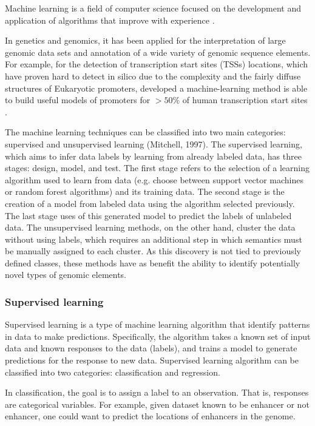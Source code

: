 Machine learning is a field of computer science focused on the development and application of algorithms that improve with experience \cite{mitchell1997machine}.

In genetics and genomics, it has been applied
 for the interpretation of large genomic data sets and annotation of a wide variety of genomic sequence elements.
For example, for the detection of  transcription start sites (TSSs) locations, which have proven hard to detect in silico due to the complexity and the fairly diffuse structures of Eukaryotic promoters,  developed a machine-learning method is able to build useful models of promoters for $>50\%$ of human transcription start sites \cite{down2002computational}.

The machine learning techniques can be classified into two main categories: supervised and unsupervised learning (Mitchell, 1997). The supervised learning, which aims to infer data labels by learning from already labeled data, has three stages: design, model, and test. The first stage refers to the selection of a learning algorithm used to learn from data (e.g. choose between support vector machines or random forest algorithms) and its training data. The second stage is the creation of a model from labeled data using the algorithm selected previously.  The last stage uses of this generated model to  predict the labels of unlabeled data.
The unsupervised learning methods, on the other hand,
cluster the data without using labels, which requires an additional step in which semantics must be manually assigned to each cluster. As this discovery is not tied to previously defined classes, these methods have as benefit the ability to identify potentially novel types of genomic elements.




\subsubsection{Supervised learning}

Supervised learning is a type of machine learning algorithm that identify patterns in data to make predictions.
Specifically, the algorithm takes a known set of input data and known responses to the data (labels), and trains a model to generate predictions for the response to new data.
Supervised learning algorithm can be classified into two  categories: classification and regression.

In classification, the goal is to assign a label to an observation. That is, responses are categorical variables.
For example, given dataset known to be
enhancer or not enhancer, one could want to predict the locations of enhancers in the genome.

